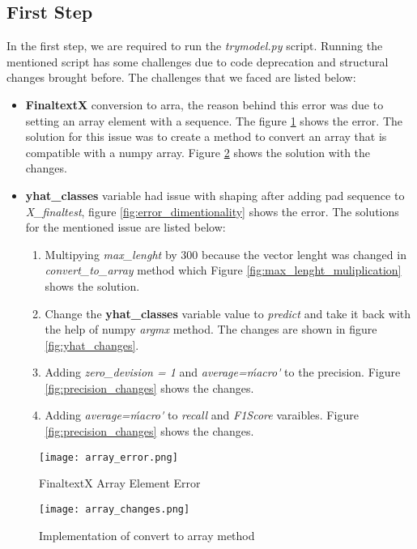 \subsection{First Step}
In the first step, we are required to run the \textit{trymodel.py} script. 
Running the mentioned script has some challenges due to code deprecation and structural changes brought before. 
The challenges that we faced are listed below:
\begin{itemize}
    \item \textbf{FinaltextX} conversion to arra, the reason behind this error was due to setting an array element with a sequence. The figure \ref{fig:array_error} shows the error. The solution for this issue was to create a method to convert an array that is compatible with a numpy array. Figure \ref{fig:array_changes} shows the solution with the changes.
    \item \textbf{yhat\_classes} variable had issue with shaping after adding pad sequence to \textit{X\_finaltest}, figure \ref{fig:error_dimentionality} shows the error. 
 The solutions for the mentioned issue are listed below:
        \begin{enumerate}
            \item Multipying \textit{max\_lenght} by 300 because the vector lenght was changed in \textit{convert\_to\_array} method which Figure \ref{fig:max_lenght_muliplication} shows the solution.
            \item Change the \textbf{yhat\_classes} variable value to \textit{predict} and take it back with the help of numpy \textit{argmx} method. The changes are shown in figure \ref{fig:yhat_changes}.
            \item Adding \textit{zero\_devision = 1} and \textit{average=\'macro\'} to the precision. Figure \ref{fig:precision_changes} shows the changes.
            \item Adding \textit{average=\'macro\'} to \textit{recall} and \textit{F1Score} varaibles. Figure \ref{fig:precision_changes} shows the changes.
        \end{enumerate} 
\end{itemize}

\begin{figure}[H]
    \centering
    \texttt{[image: array\_error.png]}
    \caption{FinaltextX Array Element Error}
    \label{fig:array_error}
\end{figure}

\begin{figure}[H]
    \centering
    \texttt{[image: array\_changes.png]}
    \caption{Implementation of convert to array method}
    \label{fig:array_changes}
\end{figure}

